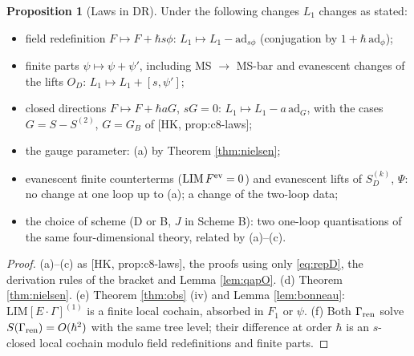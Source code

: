 \documentclass[11pt]{article}
\theoremstyle{definition}
\newtheorem{proposition}[definition]{Proposition}
\numberwithin{equation}{section}
\begin{document}
\begin{proposition}[Laws in DR]
\label{prop:lawsD}
Under the following changes $L_1$ changes as stated:
\begin{itemize}
\item[(a)] field redefinition $F\mapsto F+\hbar s\phi$: $L_1\mapsto L_1-\mathrm{ad}_{s\phi}$ (conjugation by $1+\hbar\,\mathrm{ad}_\phi$);
\item[(b)] finite parts $\psi\mapsto\psi+\psi'$, including MS $\to$ MS-bar and evanescent changes of the lifts $O_D$: $L_1\mapsto L_1+[s,\psi']$;
\item[(c)] closed directions $F\mapsto F+\hbar aG$, $sG=0$: $L_1\mapsto L_1-a\,\mathrm{ad}_G$, with the cases $G=S-S^{(2)}$, $G=G_B$ of [HK, prop:c8-laws];
\item[(d)] the gauge parameter: (a) by Theorem \ref{thm:nielsen};
\item[(e)] evanescent finite counterterms ($\mathrm{LIM}\,F^{\rm ev}=0$) and evanescent lifts of $S^{(k)}_D$, $\Psi$: no change at one loop up to (a); a change of the two-loop data;
\item[(f)] the choice of scheme (D or B, $J$ in Scheme B): two one-loop quantisations of the same four-dimensional theory, related by (a)--(c).
\end{itemize}
\end{proposition}

\begin{proof}
(a)--(c) as [HK, prop:c8-laws], the proofs using only \eqref{eq:repD}, the derivation rules of the bracket and Lemma \ref{lem:qapO}. (d) Theorem \ref{thm:nielsen}. (e) Theorem \ref{thm:obs} (iv) and Lemma \ref{lem:bonneau}: $\mathrm{LIM}[E\cdot\Gamma]^{(1)}$ is a finite local cochain, absorbed in $F_1$ or $\psi$. (f) Both $\Gamma_{\rm ren}$ solve $S(\Gamma_{\rm ren})=O(\hbar^2)$ with the same tree level; their difference at order $\hbar$ is an $s$-closed local cochain modulo field redefinitions and finite parts.
\end{proof}
\end{document}
